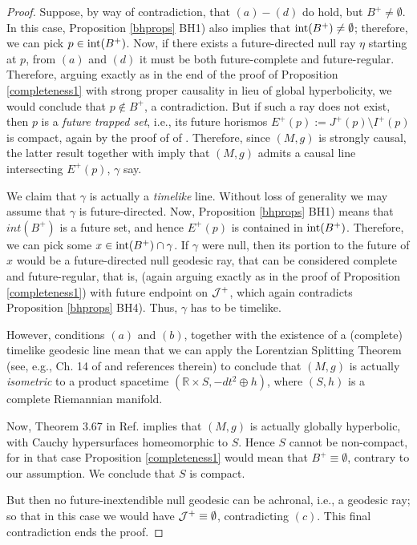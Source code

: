 \begin{proof}
Suppose, by way of contradiction, that $(a)-(d)$ do hold, but $B^+ \neq \emptyset$. In this case, Proposition \ref{bhprops} BH1) also implies that ${\rm int} (B^+) \neq \emptyset$; therefore, we can pick $p \in {\rm int} (B^+)$. Now, if there exists a future-directed null ray $\eta$ starting at $p$, from $(a)$ and $(d)$ it must be both future-complete and future-regular. Therefore, arguing exactly as in the end of the proof of Proposition \ref{completeness1} with strong proper causality in lieu of global hyperbolicity, we would conclude that $p \notin B^+$, a contradiction. But if such a ray does not exist, then $p$ is a {\em future trapped set}, i.e., its future horismos $E^+(p):= J^+(p) \setminus I^+(p)$ is compact, again by the proof of  of \cite[Prop. 8.18, Ch. 8, p. 289]{BeemGlobalLorentzianGeometry1996}. Therefore, since $(M,g)$ is strongly causal, the latter result together with \cite[Theor. 8.13]{BeemGlobalLorentzianGeometry1996} imply that $(M,g)$ admits a causal line intersecting $E^+(p)$, $\gamma$ say.

We claim that $\gamma$ is actually a {\em timelike} line. Without loss of generality we may assume that $\gamma$ is future-directed. Now, Proposition \ref{bhprops} BH1) means that $int(B^+)$ is a future set, and hence $E^+(p)$ is contained in ${\rm int}(B^+)$. Therefore, we can pick some $x \in {\rm int}(B^+) \cap \gamma$. If $\gamma$ were null, then its portion to the future of $x$ would be a future-directed null geodesic ray, that can be considered complete and future-regular, that is, (again arguing exactly as in the proof of Proposition \ref{completeness1}) with future endpoint on ${\cal J}^+$, which again contradicts Proposition \ref{bhprops} BH4). Thus, $\gamma$ has to be timelike.

However, conditions $(a)$ and $(b)$, together with the existence of a (complete) timelike geodesic line mean that we can apply the Lorentzian Splitting Theorem (see, e.g., Ch. 14 of \cite{BeemGlobalLorentzianGeometry1996} and references therein) to conclude that $(M,g)$ is actually {\em isometric} to a product spacetime $(\mathbb{R}\times S,-dt^2\oplus h)$, where $(S,h)$ is a complete Riemannian manifold.

Now, Theorem 3.67 in Ref. \cite{BeemGlobalLorentzianGeometry1996} implies that $(M,g)$ is actually globally hyperbolic, with Cauchy hypersurfaces homeomorphic to $S$. Hence $S$ cannot be non-compact, for in that case Proposition \ref{completeness1} would mean that $B^+ \equiv \emptyset$, contrary to our assumption. We conclude that $S$ is compact.

But then no future-inextendible null geodesic can be achronal, i.e., a geodesic ray; so that in this case we would have ${\cal J}^+ \equiv \emptyset$, contradicting $(c)$. This final contradiction ends the proof.
\end{proof}


